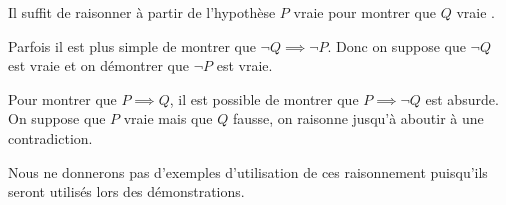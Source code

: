 \begin{definition}
	Il suffit de raisonner à partir de l'hypothèse \og $P$ vraie \fg pour montrer que \og $Q$ vraie \fg . 
\end{definition}

\begin{definition}
	Parfois il est plus simple de montrer que $\neg Q \implies \neg P$.
	Donc on suppose que $\neg Q$ est vraie et on démontrer que $\neg P$ est vraie.
\end{definition}

\begin{definition}
	Pour montrer que $P \implies Q$, il est possible de montrer que $P \implies \neg Q$ est absurde.
	\\
	On suppose que $P$ vraie mais que $Q$ fausse, on raisonne jusqu'à aboutir à une contradiction.
\end{definition}

Nous ne donnerons pas d'exemples d'utilisation de ces raisonnement puisqu'ils seront utilisés lors des démonstrations.